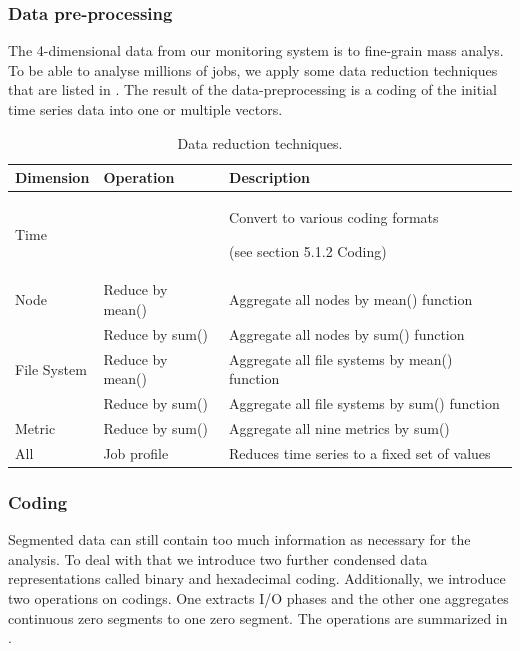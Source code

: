 \documentclass[]{llncs}
\begin{document}
\subsubsection{Data pre-processing}
The 4-dimensional data from our monitoring system is to fine-grain mass analys. To be able to analyse millions of jobs, we apply some data reduction techniques that are listed in .
The result of the data-preprocessing is a coding of the initial time series data into one or multiple vectors.

\begin{table}
	\centering
	\begin{tabular}{lll}
		\hline
		Dimension       & Operation                                    &  Description                                                       \\ 
		\hline
		Time            &                                              &  Convert to various coding formats \par (see section 5.1.2 Coding) \\ 
		\hline
		Node            & Reduce by mean()                             &  Aggregate all nodes by mean() function                            \\ 
		\hline
		                & Reduce by sum()                              &  Aggregate all nodes by sum() function                             \\ 
		\hline
		File System     & Reduce by mean()                             &  Aggregate all file systems by mean() function                     \\ 
		\hline
		                & 
		Reduce by sum() & Aggregate all file systems by sum() function \\ 
		\hline
		Metric          & Reduce by sum()                              &  Aggregate all nine metrics by sum()                               \\ 
		\hline
		All             & Job profile                                  &  Reduces time series to a fixed set of values                      \\ 
		\hline
	\end{tabular}
	\caption{Data reduction techniques.}
	\label{tab:reduction_techniques}
\end{table}




\subsubsection{Coding}
Segmented data can still contain too much information as necessary for the analysis.
To deal with that we introduce two further condensed data representations called binary and hexadecimal coding.
Additionally, we introduce two operations on codings.
One extracts I/O phases and the other one aggregates continuous zero segments to one zero segment.
The operations are summarized in .
\end{document}
